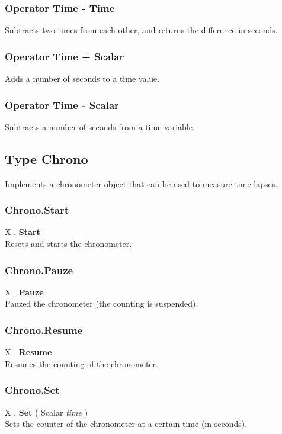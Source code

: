\documentclass[10pt]{book}
\begin{document}
\subsubsection{Operator Time - Time \label{O:Time-Time}}
Subtracts two times from each other, and returns the difference in seconds.

\subsubsection{Operator Time + Scalar \label{O:Time+Scalar}}
Adds a number of seconds to a time value.

\subsubsection{Operator Time - Scalar \label{O:Time-Scalar}}
Subtracts a number of seconds from a time variable.

\subsection{Type Chrono \label{T:Chrono}}
Implements a chronometer object that can be used to measure time lapses.

\subsubsection{Chrono.Start \label{F:Chrono:Start}}
X . \textbf{Start} \\
Resets and starts the chronometer.

\subsubsection{Chrono.Pauze \label{F:Chrono:Pauze}}
X . \textbf{Pauze} \\
Pauzed the chronometer (the counting is suspended).

\subsubsection{Chrono.Resume \label{F:Chrono:Resume}}
X . \textbf{Resume} \\
Resumes the counting of the chronometer.

\subsubsection{Chrono.Set \label{F:Chrono:Set}}
X . \textbf{Set} ( Scalar \textit{time} ) \\
Sets the counter of the chronometer at a certain time (in seconds).
\end{document}

